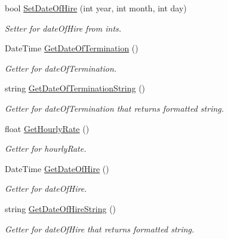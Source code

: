 \begin{DoxyCompactItemize}
bool \hyperlink{class_all_employees_1_1_parttime_employee_a8f49e4626627f95f098c56f092207a8e}{Set\+Date\+Of\+Hire} (int year, int month, int day)
\begin{DoxyCompactList}\small\item\em Setter for date\+Of\+Hire from ints. \end{DoxyCompactList}\item 
Date\+Time \hyperlink{class_all_employees_1_1_parttime_employee_a58fdbd9bf434cfeba1d3418bf1576100}{Get\+Date\+Of\+Termination} ()
\begin{DoxyCompactList}\small\item\em Getter for date\+Of\+Termination. \end{DoxyCompactList}\item 
string \hyperlink{class_all_employees_1_1_parttime_employee_aece6dee0304f86e5d03cb751bd3cbb49}{Get\+Date\+Of\+Termination\+String} ()
\begin{DoxyCompactList}\small\item\em Getter for date\+Of\+Termination that returns formatted string. \end{DoxyCompactList}\item 
float \hyperlink{class_all_employees_1_1_parttime_employee_a05b1fd21f7df07abc013ced6df7959f4}{Get\+Hourly\+Rate} ()
\begin{DoxyCompactList}\small\item\em Getter for hourly\+Rate. \end{DoxyCompactList}\item 
Date\+Time \hyperlink{class_all_employees_1_1_parttime_employee_a266fb09cc25fcf9d5e475d8859b1fdac}{Get\+Date\+Of\+Hire} ()
\begin{DoxyCompactList}\small\item\em Getter for date\+Of\+Hire. \end{DoxyCompactList}\item 
string \hyperlink{class_all_employees_1_1_parttime_employee_a18bd3a43e374b89bdd8f6e2ec9f9e51e}{Get\+Date\+Of\+Hire\+String} ()
\begin{DoxyCompactList}\small\item\em Getter for date\+Of\+Hire that returns formatted string. \end{DoxyCompactList}\end{DoxyCompactItemize}
